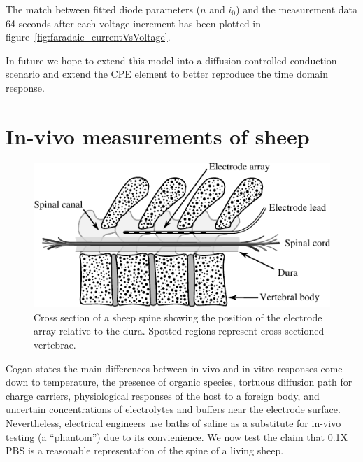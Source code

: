 \documentclass[journal, a4paper]{IEEEtran}
\begin{document}
The match between fitted diode parameters ($n$ and $i_{0}$) and the measurement data 64 seconds after each voltage increment has been plotted in figure~\ref{fig:faradaic_currentVsVoltage}.

In future we hope to extend this model into a diffusion controlled conduction scenario and extend the CPE element to better reproduce the time domain response.





\section{In-vivo measurements of sheep}

\begin{figure}
    \begin{center}
        \includegraphics{graphics/sheepSpine}
    \end{center}
    \caption{Cross section of a sheep spine showing the position of the electrode array relative to the dura. Spotted regions represent cross sectioned vertebrae.}
    \label{fig:sheepSpine}
\end{figure}
Cogan states the main differences between in-vivo and in-vitro responses come down to temperature, the presence of organic species, tortuous diffusion path for charge carriers, physiological responses of the host to a foreign body, and uncertain concentrations of electrolytes and buffers near the electrode surface.\cite{Cogan2008}
Nevertheless, electrical engineers use baths of saline as a substitute for in-vivo testing (a ``phantom'') due to its convienience.
We now test the claim that 0.1X PBS is a reasonable representation of the spine of a living sheep.
\end{document}
